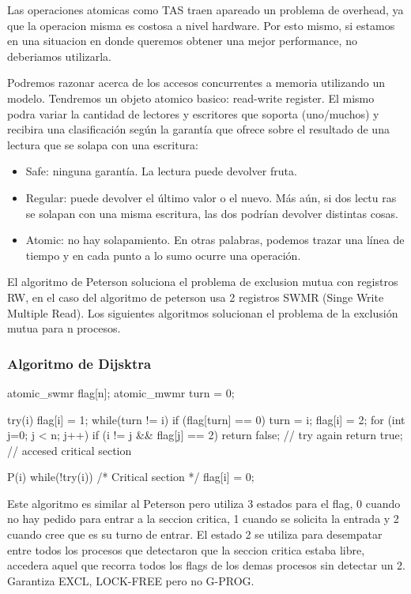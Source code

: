 \documentclass{article}
\begin{document}
Las operaciones atomicas como TAS traen apareado un problema de overhead, ya que la operacion misma es costosa a nivel hardware. Por esto mismo, si estamos en una situacion en donde queremos obtener una mejor performance, no deberiamos utilizarla.

Podremos razonar acerca de los accesos concurrentes a memoria utilizando un modelo. Tendremos un objeto atomico basico: read-write register. El mismo podra variar la cantidad de lectores y escritores que soporta (uno/muchos) y recibira una clasificación según la garantía que ofrece sobre el resultado de una lectura que se solapa con una escritura:

\begin{itemize}
\item Safe: ninguna garantía. La lectura puede devolver fruta.
\item Regular: puede devolver el último valor o el nuevo. Más aún, si dos lectu ras se solapan con una misma escritura, las dos podrían devolver distintas cosas.
\item Atomic: no hay solapamiento. En otras palabras, podemos trazar una línea de tiempo y en cada punto a lo sumo ocurre una operación.
\end{itemize}

El algoritmo de Peterson soluciona el problema de exclusion mutua con registros RW, en el caso del algoritmo de peterson usa 2 registros SWMR (Singe Write Multiple Read). Los siguientes algoritmos solucionan el problema de la exclusión mutua para n procesos.

\subsubsection{Algoritmo de Dijsktra}

\begin{code}
 atomic_swmr flag[n];
 atomic_mwmr turn = 0;
 
 try(i) {
    flag[i] = 1;
    while(turn != i) {
        if (flag[turn] == 0) {
            turn = i;
        }
    }
    flag[i] = 2;
    for (int j=0; j < n; j++) {
        if (i != j && flag[j] == 2) {
            return false;               // try again
        }
    }
    return true;                        // accesed critical section
 }
 
 P(i) {
    while(!try(i)) {}
    /* Critical section */
    flag[i] = 0;
 }
\end{code}

Este algoritmo es similar al Peterson pero utiliza 3 estados para el flag, 0 cuando no hay pedido para entrar a la seccion critica, 1 cuando se solicita la entrada y 2 cuando cree que es su turno de entrar. El estado 2 se utiliza para desempatar entre todos los procesos que detectaron que la seccion critica estaba libre, accedera aquel que recorra todos los flags de los demas procesos sin detectar un 2. Garantiza EXCL, LOCK-FREE pero no G-PROG.
\end{document}

